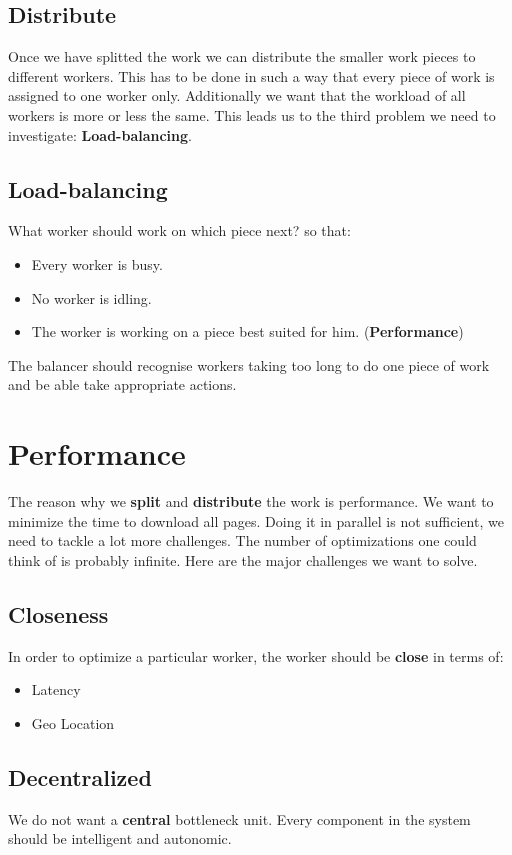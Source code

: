 \subsection{Distribute}
Once we have splitted the work we can distribute the smaller work pieces to different workers. This has to be done in such a way that every piece of work is assigned to one worker only. Additionally we want that the workload of all workers is more or less the same. This leads us to the third problem we need to investigate: \textbf{Load-balancing}.
\subsection{Load-balancing}
What worker should work on which piece next? so that:
\begin{itemize}
\item Every worker is busy.
\item No worker is idling.
\item The worker is working on a piece best suited for him. (\textbf{Performance})
\end{itemize}
The balancer should recognise workers taking too long to do one piece of work and be able take appropriate actions.

\section{Performance}
The reason why we \textbf{split} and \textbf{distribute} the work is performance. We want to minimize the time to download all pages. Doing it in parallel is not sufficient, we need to tackle a lot more challenges. The number of optimizations one could think of is probably infinite. Here are the major challenges we want to solve.
\subsection{Closeness}
\label{closeness}
In order to optimize a particular worker, the worker should be \textbf{close} in terms of:
\begin{itemize}
\item Latency
\item Geo Location
\end{itemize}
\subsection{Decentralized}
We do not want a \textbf{central} bottleneck unit. Every component in the system should be intelligent and autonomic.
